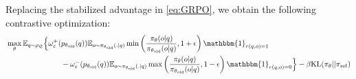 \documentclass[11pt,reqno]{amsart}
\begin{document}
\iffalse
 \begin{minipage}{0.48\textwidth}
\begin{equation}
A(q,o) =
\begin{cases} 
\omega^+_{\varepsilon}(p(q))& \text{if } r(q,o) =1, \\
-\omega^-_{\varepsilon}(p(q)) & \text{if } r(q,o)= 0.
\end{cases}
\label{eq:cases}
\end{equation}
\end{minipage}
\quad \text{where}
\begin{minipage}{0.48\textwidth}
\begin{align}
 \omega^+_{\varepsilon}(p) &=  \frac{1-p}{\sqrt{p(1-p) +\varepsilon}} \nonumber \\
 \omega^-_{\varepsilon}(p) &= \frac{p}{\sqrt{p(1-p) +\varepsilon}}.
 \label{eq:weights}
\end{align}
\end{minipage}

\noindent Let us denote 
\begin{align}
 \omega^+_{\varepsilon}( p) &=  \frac{1-p  }{\sqrt{p(1-p) +\varepsilon}} \nonumber\\
 \omega^-_{\varepsilon}(p) &= \frac{p}{\sqrt{p(1-p) +\varepsilon}}. 
 \label{eq:weights}
 \end{align}
\fi
Replacing the stabilized advantage in \eqref{eq:GRPO},  we obtain the following contrastive optimization:
 \begin{align*}
&   \max_{\theta}  \mathbb{E}_{q\sim \rho_{\mathcal{Q}}} \Big \{  \omega^+_{\varepsilon} (p_{\theta_{\text{old}}}(q) ) \mathbb{E}_{o\sim \pi_{\theta_{\text{old}}} (. |q) }  \min\left(\frac{\pi_{\theta} (o| q )}{\pi_{\theta_{\text{old}}}(o| q)},1+\epsilon \right)\mathbbm{1}_{r(q,o)=1} \\
& ~~~~~~~~~~~~~~~~~~~~~~ - \omega^-_{\varepsilon} (p_{\theta_{\text{old}}}(q) ) \mathbb{E}_{o\sim \pi_{\theta_{\text{old}}} (. |q) } \max \left(\frac{\pi_{\theta} (o| q )}{\pi_{\theta_{\text{old}}}(o| q)}, 1-\epsilon \right ) \mathbbm{1}_{r(q,o)=0} \Big \}  - \beta \mathrm{KL} (\pi_{\theta} || \pi_{\mathrm{ref}}) 
\end{align*}
\end{document}
